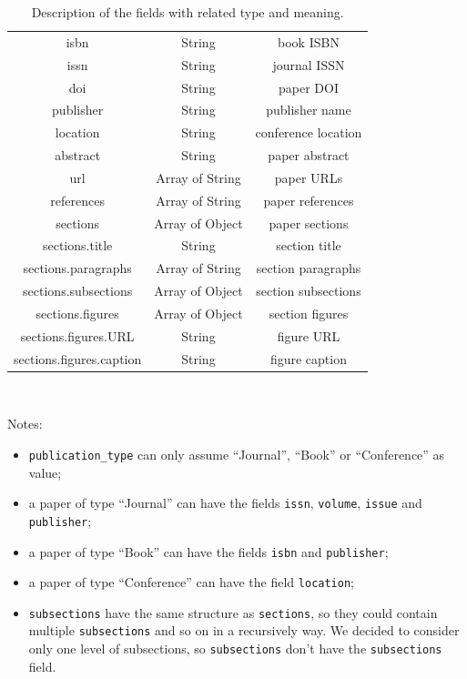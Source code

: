 \begin{table}[H]
\begin{tabular}{| c | c | c |}
        isbn                     & String          & book ISBN\T\B             \\
        issn                     & String          & journal ISSN\T\B          \\
        doi                      & String          & paper DOI\T\B             \\
        publisher                & String          & publisher name\T\B        \\
        location                 & String          & conference location\T\B   \\
        abstract                 & String          & paper abstract\T\B        \\
        url                      & Array of String & paper URLs\T\B            \\
        references               & Array of String & paper references\T\B      \\
        sections                 & Array of Object & paper sections\T\B        \\
        sections.title           & String          & section title\T\B         \\
        sections.paragraphs      & Array of String & section paragraphs\T\B    \\
        sections.subsections     & Array of Object & section subsections\T\B   \\
        sections.figures         & Array of Object & section figures\T\B       \\
        sections.figures.URL     & String          & figure URL\T\B            \\
        sections.figures.caption & String          & figure caption\T\B        \\
        \hline
    \end{tabular}
    \\[8pt]
    \caption{Description of the fields with related type and meaning.}
    \label{tab:document_structure_mongodb}%
\end{table}
Notes:
\begin{itemize}
    \item \verb|publication_type| can only assume ``Journal'', ``Book'' or ``Conference'' as value;
    \item a paper of type ``Journal'' can have the fields \verb|issn|, \verb|volume|, \verb|issue| and \verb|publisher|;
    \item a paper of type ``Book'' can have the fields \verb|isbn| and \verb|publisher|;
    \item a paper of type ``Conference'' can have the field \verb|location|;
    \item \verb|subsections| have the same structure as \verb|sections|, so they could contain multiple \verb|subsections| and so on in a recursively way.
    We decided to consider only one level of subsections, so \verb|subsections| don't have the \verb|subsections| field.
\end{itemize}
